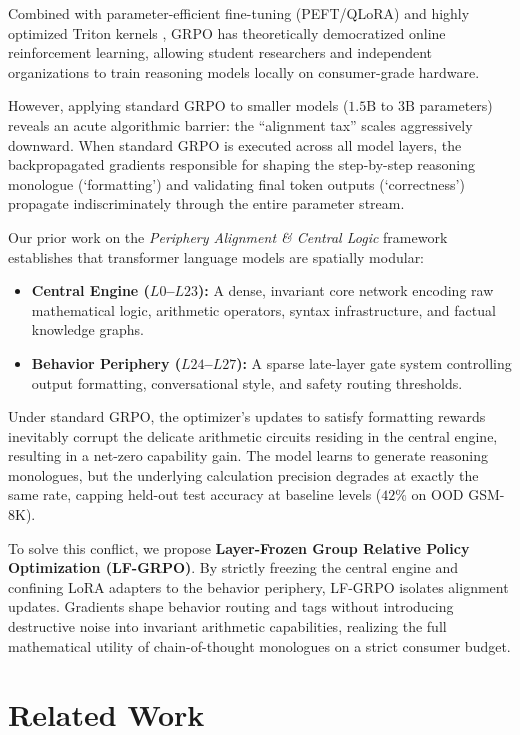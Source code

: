 \documentclass[11pt]{article}
\begin{document}
Combined with parameter-efficient fine-tuning (PEFT/QLoRA) and highly optimized Triton kernels \cite{unsloth2026}, GRPO has theoretically democratized online reinforcement learning, allowing student researchers and independent organizations to train reasoning models locally on consumer-grade hardware. 

However, applying standard GRPO to smaller models ($1.5\text{B}$ to $3\text{B}$ parameters) reveals an acute algorithmic barrier: the ``alignment tax'' scales aggressively downward. When standard GRPO is executed across all model layers, the backpropagated gradients responsible for shaping the step-by-step reasoning monologue (`formatting') and validating final token outputs (`correctness') propagate indiscriminately through the entire parameter stream. 

Our prior work on the \textit{Periphery Alignment \& Central Logic} framework \cite{dave2026safety} establishes that transformer language models are spatially modular:
\begin{itemize}
    \item \textbf{Central Engine ($L0$--$L23$):} A dense, invariant core network encoding raw mathematical logic, arithmetic operators, syntax infrastructure, and factual knowledge graphs.
    \item \textbf{Behavior Periphery ($L24$--$L27$):} A sparse late-layer gate system controlling output formatting, conversational style, and safety routing thresholds.
\end{itemize}

Under standard GRPO, the optimizer's updates to satisfy formatting rewards inevitably corrupt the delicate arithmetic circuits residing in the central engine, resulting in a net-zero capability gain. The model learns to generate reasoning monologues, but the underlying calculation precision degrades at exactly the same rate, capping held-out test accuracy at baseline levels ($42\%$ on OOD GSM-8K).

To solve this conflict, we propose \textbf{Layer-Frozen Group Relative Policy Optimization (LF-GRPO)}. By strictly freezing the central engine and confining LoRA adapters to the behavior periphery, LF-GRPO isolates alignment updates. Gradients shape behavior routing and tags without introducing destructive noise into invariant arithmetic capabilities, realizing the full mathematical utility of chain-of-thought monologues on a strict consumer budget.

\section{Related Work}
\end{document}
